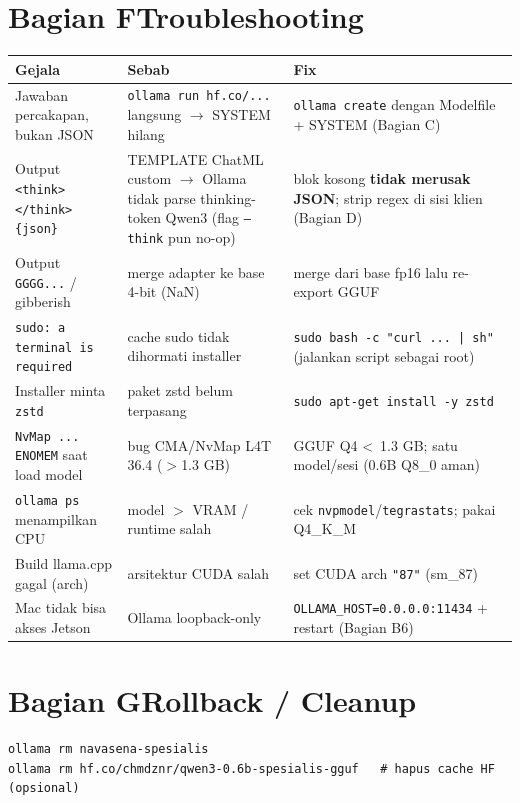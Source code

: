 \documentclass[11pt,a4paper]{article}
\begin{document}
\section*{\color{nvgreen}Bagian F\quad Troubleshooting}
\renewcommand{\arraystretch}{1.3}
\noindent\begin{tabularx}{\textwidth}{@{}X X X@{}}
\toprule
\rowcolor{nvgreen}\color{white}\textbf{Gejala} & \color{white}\textbf{Sebab} & \color{white}\textbf{Fix} \\
\midrule
Jawaban percakapan, bukan JSON & \texttt{ollama run hf.co/...} langsung $\to$ SYSTEM hilang & \texttt{ollama create} dengan Modelfile + SYSTEM (Bagian C) \\
\rowcolor{nvbg}Output \texttt{<think></think>\{json\}} & TEMPLATE ChatML custom $\to$ Ollama tidak parse thinking-token Qwen3 (flag \texttt{--think} pun no-op) & blok kosong \textbf{tidak merusak JSON}; strip regex di sisi klien (Bagian D) \\
Output \texttt{GGGG...} / gibberish & merge adapter ke base 4-bit (NaN) & merge dari base fp16 lalu re-export GGUF \\
\rowcolor{nvbg}\texttt{sudo: a terminal is required} & cache sudo tidak dihormati installer & \texttt{sudo bash -c "curl ... | sh"} (jalankan script sebagai root) \\
Installer minta \texttt{zstd} & paket zstd belum terpasang & \texttt{sudo apt-get install -y zstd} \\
\rowcolor{nvbg}\texttt{NvMap ... ENOMEM} saat load model & bug CMA/NvMap L4T 36.4 ($>$1.3 GB) & GGUF Q4 \textless\ 1.3 GB; satu model/sesi (0.6B Q8\_0 aman) \\
\texttt{ollama ps} menampilkan CPU & model $>$ VRAM / runtime salah & cek \texttt{nvpmodel}/\texttt{tegrastats}; pakai Q4\_K\_M \\
\rowcolor{nvbg}Build llama.cpp gagal (arch) & arsitektur CUDA salah & set CUDA arch \texttt{"87"} (sm\_87) \\
Mac tidak bisa akses Jetson & Ollama loopback-only & \texttt{OLLAMA\_HOST=0.0.0.0:11434} + restart (Bagian B6) \\
\bottomrule
\end{tabularx}

\section*{\color{nvgreen}Bagian G\quad Rollback / Cleanup}
\begin{lstlisting}[style=nvsh]
ollama rm navasena-spesialis
ollama rm hf.co/chmdznr/qwen3-0.6b-spesialis-gguf   # hapus cache HF (opsional)
\end{lstlisting}
\end{document}
